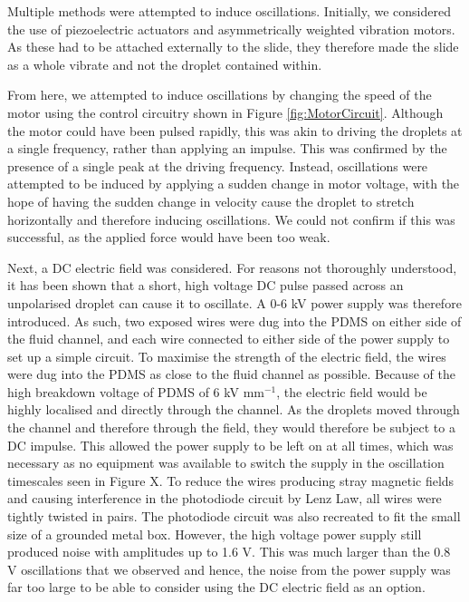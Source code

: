 \documentclass{physics_article_B}
\begin{document}
        Multiple methods were attempted to induce oscillations. Initially, we considered the use of piezoelectric actuators and asymmetrically weighted vibration motors. As these had to be attached externally to the slide, they therefore made the slide as a whole vibrate and not the droplet contained within. 
        
        From here, we attempted to induce oscillations by changing the speed of the motor using the control circuitry shown in Figure \ref{fig:MotorCircuit}. Although the motor could have been pulsed rapidly, this was akin to driving the droplets at a single frequency, rather than applying an impulse. This was confirmed by the presence of a single peak at the driving frequency. Instead, oscillations were attempted to be induced by applying a sudden change in motor voltage, with the hope of having the sudden change in velocity cause the droplet to stretch horizontally and therefore inducing oscillations. We could not confirm if this was successful, as the applied force would have been too weak. 
        
        Next, a DC electric field was considered. For reasons not thoroughly understood, it has been shown that a short, high voltage DC pulse passed across an unpolarised droplet can cause it to oscillate. A 0-6 kV power supply was therefore introduced. As such, two exposed wires were dug into the PDMS on either side of the fluid channel, and each wire connected to either side of the power supply to set up a simple circuit. To maximise the strength of the electric field, the wires were dug into the PDMS as close to the fluid channel as possible. Because of the high breakdown voltage of PDMS\cite{PDMSBreakdown} of 6 kV mm$^{-1}$, the electric field would be highly localised and directly through the channel. As the droplets moved through the channel and therefore through the field, they would therefore be subject to a DC impulse. This allowed the power supply to be left on at all times, which was necessary as no equipment was available to switch the supply in the oscillation timescales seen in Figure X. To reduce the wires producing stray magnetic fields and causing interference in the photodiode circuit by Lenz Law, all wires were tightly twisted in pairs. The photodiode circuit was also recreated to fit the small size of a grounded metal box. However, the high voltage power supply still produced noise with amplitudes up to 1.6 V. This was much larger than the 0.8 V oscillations that we observed and hence, the noise from the power supply was far too large to be able to consider using the DC electric field as an option.
        
\end{document}
